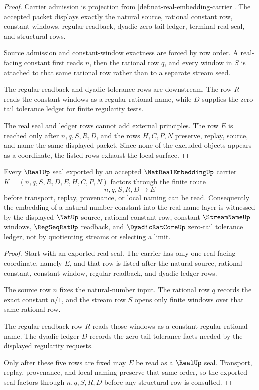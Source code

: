 \begin{proof}
Carrier admission is projection from \autoref{def:nat-real-embedding-carrier}. The accepted packet displays exactly the natural source, rational constant row, constant windows, regular readback, dyadic zero-tail ledger, terminal real seal, and structural rows.

Source admission and constant-window exactness are forced by row order. A real-facing constant first reads $n$, then the rational row $q$, and every window in $S$ is attached to that same rational row rather than to a separate stream seed.

The regular-readback and dyadic-tolerance rows are downstream. The row $R$ reads the constant windows as a regular rational name, while $D$ supplies the zero-tail tolerance ledger for finite regularity tests.

The real seal and ledger rows cannot add external principles. The row $E$ is reached only after $n,q,S,R,D$, and the rows $H,C,P,N$ preserve, replay, source, and name the same displayed packet. Since none of the excluded objects appears as a coordinate, the listed rows exhaust the local surface.
\end{proof}

\begin{theorem}
\label{thm:nat-real-embedding-real-seal-factorization}
Every $\RealUp$ seal exported by an accepted $\NatRealEmbeddingUp$ carrier $K=(n,q,S,R,D,E,H,C,P,N)$ factors through the finite route
$$
n,q,S,R,D \longmapsto E
$$
before transport, replay, provenance, or local naming can be read. Consequently the embedding of a natural-number constant into the real-name layer is witnessed by the displayed $\NatUp$ source, rational constant row, constant $\StreamNameUp$ windows, $\RegSeqRatUp$ readback, and $\DyadicRatCoreUp$ zero-tail tolerance ledger, not by quotienting streams or selecting a limit.
\end{theorem}
\begin{proof}
Start with an exported real seal. The carrier has only one real-facing coordinate, namely $E$, and that row is listed after the natural source, rational constant, constant-window, regular-readback, and dyadic-ledger rows.

The source row $n$ fixes the natural-number input. The rational row $q$ records the exact constant $n/1$, and the stream row $S$ opens only finite windows over that same rational row.

The regular readback row $R$ reads those windows as a constant regular rational name. The dyadic ledger $D$ records the zero-tail tolerance facts needed by the displayed regularity requests.

Only after these five rows are fixed may $E$ be read as a $\RealUp$ seal. Transport, replay, provenance, and local naming preserve that same order, so the exported seal factors through $n,q,S,R,D$ before any structural row is consulted.
\end{proof}

